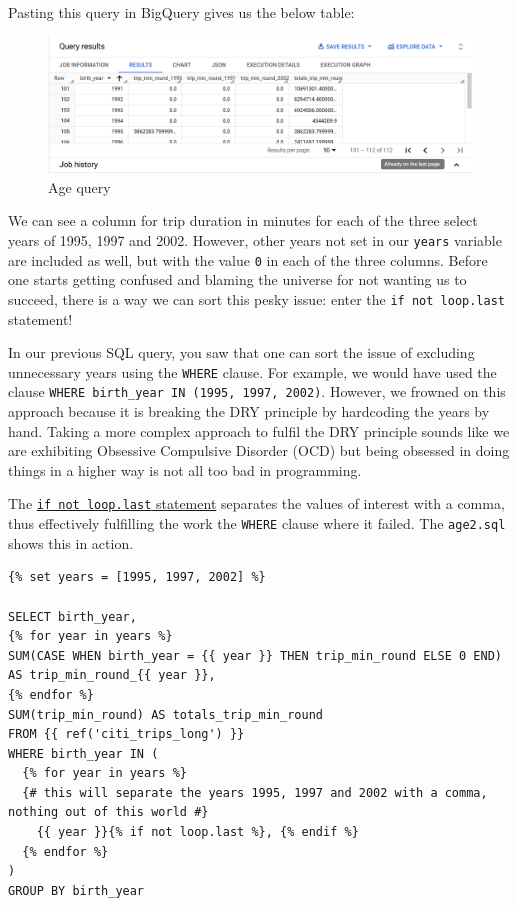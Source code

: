 \documentclass[
]{book}
\begin{document}
Pasting this query in BigQuery gives us the below table:

\begin{figure}
\centering
\includegraphics{./images/age_query.png}
\caption{Age query}
\end{figure}

We can see a column for trip duration in minutes for each of the three select years of 1995, 1997 and 2002. However, other years not set in our \texttt{years} variable are included as well, but with the value \texttt{0} in each of the three columns. Before one starts getting confused and blaming the universe for not wanting us to succeed, there is a way we can sort this pesky issue: enter the \texttt{if\ not\ loop.last} statement!

In our previous SQL query, you saw that one can sort the issue of excluding unnecessary years using the \texttt{WHERE} clause. For example, we would have used the clause \texttt{WHERE\ birth\_year\ IN\ (1995,\ 1997,\ 2002)}. However, we frowned on this approach because it is breaking the DRY principle by hardcoding the years by hand. Taking a more complex approach to fulfil the DRY principle sounds like we are exhibiting Obsessive Compulsive Disorder (OCD) but being obsessed in doing things in a higher way is not all too bad in programming.

The \href{https://docs.y42.com/docs/how-to-use-jinja}{\texttt{if\ not\ loop.last} statement} separates the values of interest with a comma, thus effectively fulfilling the work the \texttt{WHERE} clause where it failed. The \texttt{age2.sql} shows this in action.

\begin{verbatim}
{% set years = [1995, 1997, 2002] %}

SELECT birth_year, 
{% for year in years %}
SUM(CASE WHEN birth_year = {{ year }} THEN trip_min_round ELSE 0 END) AS trip_min_round_{{ year }},
{% endfor %}
SUM(trip_min_round) AS totals_trip_min_round
FROM {{ ref('citi_trips_long') }}
WHERE birth_year IN (
  {% for year in years %}
  {# this will separate the years 1995, 1997 and 2002 with a comma, nothing out of this world #}
    {{ year }}{% if not loop.last %}, {% endif %}
  {% endfor %}
)
GROUP BY birth_year
\end{verbatim}
\end{document}
